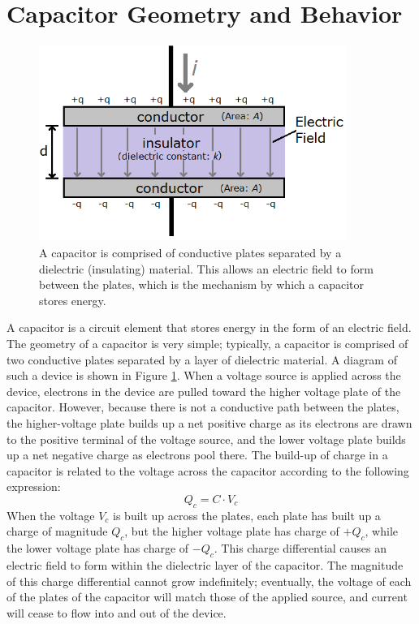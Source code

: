 \section{Capacitor Geometry and Behavior}
\label{sec:capGeometryAndBehavior}
\begin{figure}[h!]
\centering
\includegraphics[width=10cm]{figures/capacitorAnnotated.png}
\caption{A capacitor is comprised of conductive plates separated by a dielectric (insulating) material. This allows an electric field to form between the plates, which is the mechanism by which a capacitor stores energy.}
\label{capInDetail}
\end{figure}
A capacitor is a circuit element that stores energy in the form of an electric field. The geometry of a capacitor is very simple; typically, a capacitor is comprised of two conductive plates separated by a layer of dielectric material. A diagram of such a device is shown in Figure \ref{capInDetail}. When a voltage source is applied across the device, electrons in the device are pulled toward the higher voltage plate of the capacitor. However, because there is not a conductive path between the plates, the higher-voltage plate builds up a net positive charge as its electrons are drawn to the positive terminal of the voltage source, and the lower voltage plate builds up a net negative charge as electrons pool there. The build-up of charge in a capacitor is related to the voltage across the capacitor according to the following expression:
$$
Q_c = C \cdot V_c
$$
When the voltage $V_c$ is built up across the plates, each plate has built up a charge of magnitude $Q_c$, but the higher voltage plate has charge of $+Q_c$, while the lower voltage plate has charge of $-Q_c$. This charge differential causes an electric field to form within the dielectric layer of the capacitor. The magnitude of this charge differential cannot grow indefinitely; eventually, the voltage of each of the plates of the capacitor will match those of the applied source, and current will cease to flow into and out of the device. 
